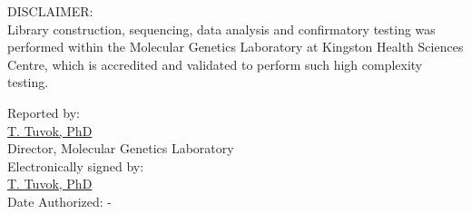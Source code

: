 \documentclass[10pt]{article}
\begin{document}
DISCLAIMER: \\
Library construction, sequencing, data analysis and confirmatory testing was performed within the Molecular Genetics Laboratory at Kingston Health Sciences Centre, which is accredited and validated to perform such high complexity testing.

\hfill \parbox{12cm}{
Reported by:\\
\underline{T. Tuvok, PhD }\\
Director, Molecular Genetics Laboratory \\

\vspace{1em}
Electronically signed by: \\
\underline{T. Tuvok, PhD}\\
Date Authorized: -
}
\end{document}
